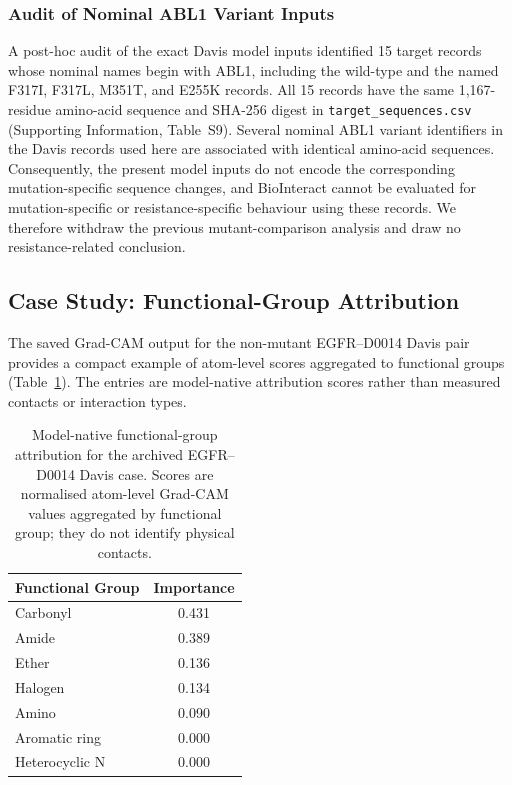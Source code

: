 \documentclass[fleqn,10pt]{wlscirep}
\begin{document}
\begingroup\color{red}
\subsubsection{Audit of Nominal ABL1 Variant Inputs}

A post-hoc audit of the exact Davis model inputs identified 15 target records
whose nominal names begin with ABL1, including the wild-type and the named
F317I, F317L, M351T, and E255K records. All 15 records have the same
1,167-residue amino-acid sequence and SHA-256 digest in
\texttt{target\_sequences.csv} (Supporting Information, Table~S9).
Several nominal ABL1 variant identifiers in the Davis records used here are
associated with identical amino-acid sequences. Consequently, the present model
inputs do not encode the corresponding mutation-specific sequence changes, and
BioInteract cannot be evaluated for mutation-specific or resistance-specific
behaviour using these records. We therefore withdraw the previous
mutant-comparison analysis and draw no resistance-related conclusion.
\endgroup

\begingroup\color{red}
\subsection{Case Study: Functional-Group Attribution}

The saved Grad-CAM output for the non-mutant EGFR--D0014 Davis pair provides a
compact example of atom-level scores aggregated to functional groups
(Table~\ref{tab:functional_group}). The entries are model-native attribution
scores rather than measured contacts or interaction types.

\begin{table}[htbp]
\centering
\caption{Model-native functional-group attribution for the archived EGFR--D0014
  Davis case. Scores are normalised atom-level Grad-CAM values aggregated by
  functional group; they do not identify physical contacts.}
\label{tab:functional_group}
\begin{tabular}{lc}
\toprule
\textbf{Functional Group} & \textbf{Importance} \\
\midrule
Carbonyl       & 0.431 \\
Amide          & 0.389 \\
Ether          & 0.136 \\
Halogen        & 0.134 \\
Amino          & 0.090 \\
Aromatic ring  & 0.000 \\
Heterocyclic N & 0.000 \\
\bottomrule
\end{tabular}
\end{table}
\end{document}
